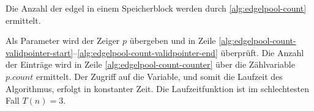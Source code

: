 Die Anzahl der \gls{edgel} in einem Speicherblock werden durch \autoref{alg:edgelpool-count} ermittelt.

Als Parameter wird der Zeiger $p$ übergeben und in Zeile
 \ref{alg:edgelpool-count-validpointer-start}--\ref{alg:edgelpool-count-validpointer-end} überprüft. Die Anzahl der
 Einträge wird in Zeile \ref{alg:edgelpool-count-counter} über die Zählvariable $\mathit{p.count}$ ermittelt. Der
 Zugriff auf die Variable, und somit die Laufzeit des Algorithmus, erfolgt in konstanter Zeit. Die Laufzeitfunktion ist
 im schlechtesten Fall $T(n) = 3$.

